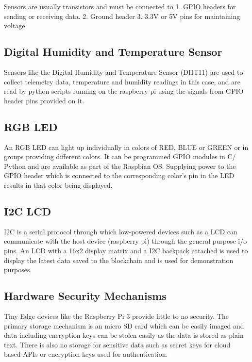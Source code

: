 \documentclass[11pt,openright]{report}
\begin{document}
Sensors are usually transistors and must be connected to 
1. GPIO headers for sending or receiving data.
2. Ground header 
3. 3.3V or 5V pins for maintaining voltage

\subsection{Digital Humidity and Temperature Sensor}
Sensors like the Digital Humidity and Temperature Sensor (DHT11) are used to collect telemetry data, temperature and humidity readings in this case, and are read by python scripts running on the raspberry pi using the signals from GPIO header pins provided on it.

\subsection{RGB LED}
An RGB LED can light up individually in colors of RED, BLUE or GREEN or in groups providing different colors. It can be programmed GPIO modules in C/ Python and are available as part of the Raspbian OS. Supplying power to the GPIO header which is connected to the corresponding color’s pin in the LED results in that color being displayed. 

\subsection{I2C LCD}
I2C is a serial protocol through which low-powered devices such as a LCD can communicate with the host device (raspberry pi) through the general purpose i/o pins. 
An LCD with a 16x2 display matrix and a I2C backpack attached is used to display the latest data saved to the blockchain and is used for demonstration purposes. 

\subsection{Hardware Security Mechanisms}
Tiny Edge devices like the Raspberry Pi 3 provide little to no security.
The primary storage mechanism is an micro SD card which can be easily imaged and data including encryption keys can be stolen easily as the data is stored as plain text. There is also no storage for sensitive data such as secret keys for cloud based APIs or encryption keys used for authentication.
\end{document}
